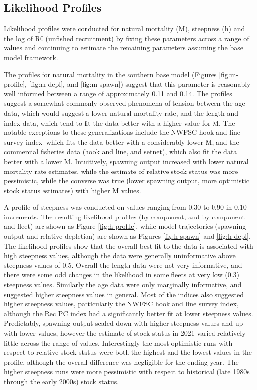 \documentclass[11pt,
  english,
  a4paper,
]{article}
\begin{document}

\hypertarget{likelihood-profiles}{%
\subsection{Likelihood Profiles}\label{likelihood-profiles}}

\leavevmode\tagmcend\tagstructend

Likelihood profiles were conducted for natural mortality (M), steepness (h) and the log of R0 (unfished recruitment) by fixing these parameters across a range of values and continuing to estimate the remaining parameters assuming the base model framework.

The profiles for natural mortality in the southern base model (Figures \ref{fig:m-profile}, \ref{fig:m-depl}, and \ref{fig:m-spawn}) suggest that this parameter is reasonably well informed between a range of approximately 0.11 and 0.14. The profiles suggest a somewhat commonly observed phenomena of tension between the age data, which would suggest a lower natural mortality rate, and the length and index data, which tend to fit the data better with a higher value for M. The notable exceptions to these generalizations include the NWFSC hook and line survey index, which fits the data better with a considerably lower M, and the commercial fisheries data (hook and line, and setnet), which also fit the data better with a lower M. Intuitively, spawning output increased with lower natural mortality rate estimates, while the estimate of relative stock status was more pessimistic, while the converse was true (lower spawning output, more optimistic stock status estimates) with higher M values.

A profile of steepness was conducted on values ranging from 0.30 to 0.90 in 0.10 increments. The resulting likelihood profiles (by component, and by component and fleet) are shown as Figure \ref{fig:h-profile}, while model trajectories (spawning output and relative depletion) are shown as Figures \ref{fig:h-spawn} and \ref{fig:h-depl}. The likelihood profiles show that the overall best fit to the data is associated with high steepness values, although the data were generally uninformative above steepness values of 0.5. Overall the length data were not very informative, and there were some odd changes in the likelihood in some fleets at very low (0.3) steepness values. Similarly the age data were only marginally informative, and suggested higher steepness values in general. Most of the indices also suggested higher steepness values, particularly the NWFSC hook and line survey index, although the Rec PC index had a significantly better fit at lower steepness values. Predictably, spawning output scaled down with higher steepness values and up with lower values, however the estimate of stock status in 2021 varied relatively little across the range of values. Interestingly the most optimistic runs with respect to relative stock status were both the highest and the lowest values in the profile, although the overall difference was negligible for the ending year. The higher steepness runs were more pessimistic with respect to historical (late 1980s through the early 2000s) stock status.
\end{document}
